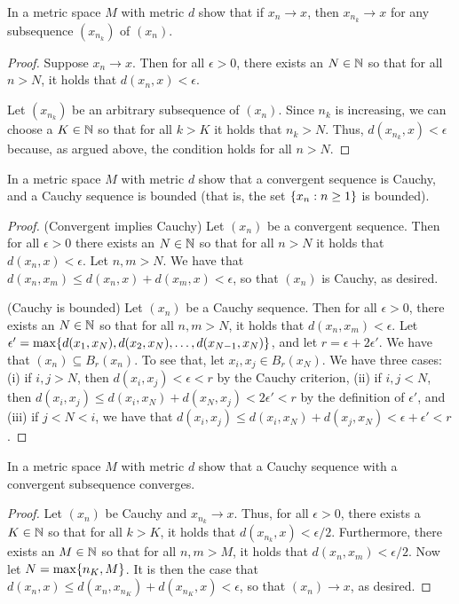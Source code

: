\begin{exercise}{35}
In a metric space $M$ with metric $d$ show that if $x_n\to x$, then $x_{n_k}\to x$ for any subsequence $(x_{n_k})$ of $(x_n)$.
\end{exercise}
\begin{proof}
Suppose $x_n\to x$. Then for all $\epsilon>0$, there exists an $N\in\mathbb{N}$ so that for all $n>N$, it holds that $d(x_n,x)<\epsilon$. 

Let $(x_{n_k})$ be an arbitrary subsequence of $(x_n)$. Since $n_k$ is increasing, we can choose a $K\in\mathbb{N}$ so that for all $k>K$ it holds that $n_k>N$. Thus, $d(x_{n_k},x)<\epsilon$ because, as argued above, the condition holds for all $n>N$.
\end{proof} 

\begin{exercise}{36}
In a metric space $M$ with metric $d$ show that a convergent sequence is Cauchy, and a Cauchy sequence is bounded (that is, the set $\{x_n:n\geq 1\}$ is bounded).
\end{exercise}
\begin{proof}
(Convergent implies Cauchy) Let $(x_n)$ be a convergent sequence. Then for all $\epsilon>0$ there exists an $N\in\mathbb{N}$ so that for all $n>N$ it holds that $d(x_n,x)<\epsilon$. Let $n,m>N$. We have that $d(x_n,x_m)\leq d(x_n,x)+d(x_m,x)<\epsilon$, so that $(x_n)$ is Cauchy, as desired.

(Cauchy is bounded) Let $(x_n)$ be a Cauchy sequence. Then for all $\epsilon>0$, there exists an $N\in\mathbb{N}$ so that for all $n,m>N$, it holds that $d(x_n,x_m)<\epsilon$. Let $\epsilon'=\max\{d(x_1,x_N),d(x_2,x_N),\dots,d(x_{N-1},x_N)\}$, and let $r=\epsilon+2\epsilon'$. We have that $(x_n)\subseteq B_r(x_n)$. To see that, let $x_i,x_j\in B_r(x_N)$. We have three cases: (i) if $i,j>N$, then $d(x_i,x_j)<\epsilon<r$ by the Cauchy criterion, (ii) if $i,j<N$, then $d(x_i,x_j)\leq d(x_i,x_N)+d(x_N,x_j)<2\epsilon' <r$ by the definition of $\epsilon'$, and (iii) if $j<N<i$, we have that $d(x_i,x_j)\leq d(x_i,x_N)+d(x_j,x_N)<\epsilon+\epsilon'<r$.
\end{proof} 

\begin{exercise}{37}
In a metric space $M$ with metric $d$ show that a Cauchy sequence with a convergent subsequence converges.
\end{exercise}
\begin{proof}
Let $(x_n)$ be Cauchy and $x_{n_k}\to x$. Thus, for all $\epsilon>0$, there exists a $K\in\mathbb{N}$ so that for all $k>K$, it holds that $d(x_{n_k},x)<\epsilon/2$. Furthermore, there exists an $M\in\mathbb{N}$ so that for all $n,m>M$, it holds that $d(x_n,x_m)<\epsilon/2$. Now let $N=\max\{n_K,M\}$. It is then the case that $d(x_n,x) \leq d(x_n, x_{n_K})+d(x_{n_K},x) <\epsilon$, so that $(x_n)\to x$, as desired.
\end{proof} 

